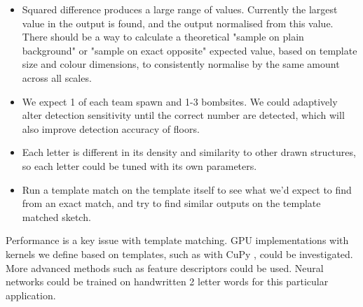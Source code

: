 \documentclass{IEEEtran}
\begin{document}
\begin{itemize}
\item Squared difference produces a large range of values. Currently the largest value in the output is found, and the output normalised from this value. There should be a way to calculate a theoretical "sample on plain background" or "sample on exact opposite" expected value, based on template size and colour dimensions, to consistently normalise by the same amount across all scales. 
\item We expect 1 of each team spawn and 1-3 bombsites. We could adaptively alter detection sensitivity until the correct number are detected, which will also improve detection accuracy of floors. 
\item Each letter is different in its density and similarity to other drawn structures, so each letter could be tuned with its own parameters.
\item Run a template match on the template itself to see what we'd expect to find from an exact match, and try to find similar outputs on the template matched sketch.
\end{itemize}

Performance is a key issue with template matching. GPU implementations with kernels we define based on templates, such as with CuPy \cite{cupy2015user}, could be investigated. More advanced methods such as feature descriptors could be used. Neural networks could be trained on handwritten 2 letter words for this particular application.



\end{document}
